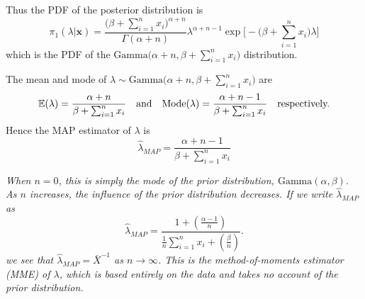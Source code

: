 \begin{solution}
Thus the PDF of the posterior distribution is 
\[
\pi_1(\lambda|\mathbf{x})	
	= \frac{\big(\beta+\sum_{i=1}^n x_i\big)^{\alpha+n}}{\Gamma(\alpha+n)}
	\lambda^{\alpha+n-1}\exp\Big[-\big(\beta+\sum_{i=1}^n x_i\big)\lambda\Big]
\]
which is the PDF of the $\text{Gamma}\Big(\alpha+n,\beta+\sum_{i=1}^n x_i\Big)$ distribution.


The mean and mode of $\lambda\sim\text{Gamma}\Big(\alpha+n,\beta+\sum_{i=1}^n x_i\Big)$ are
\[
\mathbb{E}(\lambda) = \frac{\alpha+n}{\beta+\sum_{i=1}^n x_i}
\text{\quad and\quad}
\text{Mode}(\lambda) = \frac{\alpha+n-1}{\beta+\sum_{i=1}^n x_i}
\text{\quad respectively.}
\]
Hence the MAP estimator of $\lambda$ is
\[
\hat{\lambda}_{MAP} = \frac{\alpha+n-1}{\beta+\sum_{i=1}^n x_i}
\]

\bit
\it When $n=0$, this is simply the mode of the prior distribution, $\text{Gamma}(\alpha,\beta)$.
\it As $n$ increases, the influence of the prior distribution decreases.
\it If we write $\hat{\lambda}_{MAP}$ as
\[
\hat{\lambda}_{MAP} 
	= \frac{1 + \left(\frac{\alpha-1}{n}\right)}{\frac{1}{n}\sum_{i=1}^n x_i + \left(\frac{\beta}{n}\right)}.
\]
we see that $\hat{\lambda}_{MAP}=\bar{X}^{-1}$ as $n\to\infty$.
\it This is the method-of-moments estimator (MME) of $\lambda$, which is based entirely on the data and takes no account of the prior distribution.
\eit
\end{solution}

